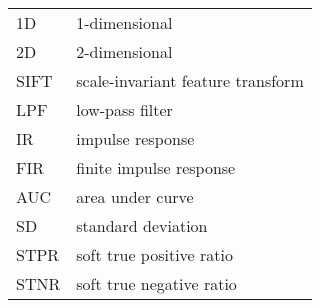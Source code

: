 \begin{tabular}{p{} p{}}

    1D & 1-dimensional \\
    2D & 2-dimensional \\
    SIFT & scale-invariant feature transform \\
    LPF & low-pass filter \\
    IR & impulse response \\
    FIR & finite impulse response \\
    AUC & area under curve \\
    SD & standard deviation \\
    STPR & soft true positive ratio \\
    STNR & soft true negative ratio \\

\end{tabular}


